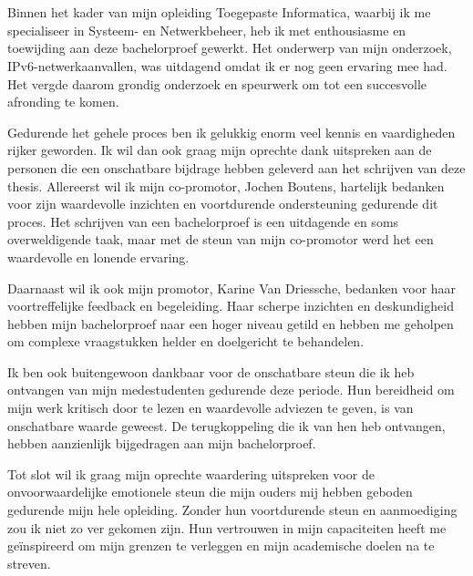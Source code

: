 
\chapter*{}%
\label{ch:voorwoord}



Binnen het kader van mijn opleiding Toegepaste Informatica, waarbij ik me specialiseer in Systeem- en Netwerkbeheer, heb ik met enthousiasme en toewijding aan deze bachelorproef gewerkt. Het onderwerp van mijn onderzoek, \newline IPv6-netwerkaanvallen, was uitdagend omdat ik er nog geen ervaring mee had. Het vergde daarom grondig onderzoek en speurwerk om tot een succesvolle afronding te komen.
\newline

Gedurende het gehele proces ben ik gelukkig enorm veel kennis en vaardigheden rijker geworden. Ik wil dan ook graag mijn oprechte dank uitspreken aan de personen die een onschatbare bijdrage hebben geleverd aan het schrijven van deze thesis. Allereerst wil ik mijn co-promotor, Jochen Boutens, hartelijk bedanken voor zijn waardevolle inzichten en voortdurende ondersteuning gedurende dit proces. Het schrijven van een bachelorproef is een uitdagende en soms overweldigende taak, maar met de steun van mijn co-promotor werd het een waardevolle en lonende ervaring.
\newline

Daarnaast wil ik ook mijn promotor, Karine Van Driessche, bedanken voor haar voortreffelijke feedback en begeleiding. Haar scherpe inzichten en deskundigheid hebben mijn bachelorproef naar een hoger niveau getild en hebben me geholpen om complexe vraagstukken helder en doelgericht te behandelen.
\newline

Ik ben ook buitengewoon dankbaar voor de onschatbare steun die ik heb ontvangen van mijn medestudenten gedurende deze periode. Hun bereidheid om mijn werk kritisch door te lezen en waardevolle adviezen te geven, is van onschatbare waarde geweest. De terugkoppeling die ik van hen heb ontvangen, hebben aanzienlijk bijgedragen aan mijn bachelorproef.
\newline

Tot slot wil ik graag mijn oprechte waardering uitspreken voor de onvoorwaardelijke emotionele steun die mijn ouders mij hebben geboden gedurende mijn hele opleiding. Zonder hun voortdurende steun en aanmoediging zou ik niet zo ver gekomen zijn. Hun vertrouwen in mijn capaciteiten heeft me geïnspireerd om mijn grenzen te verleggen en mijn academische doelen na te streven.